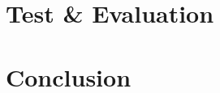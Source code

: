 \documentclass[twoside]{icldt}
\begin{document}











\chapter{Test \& Evaluation}






\chapter{Conclusion}








\appendix

\end{document}
